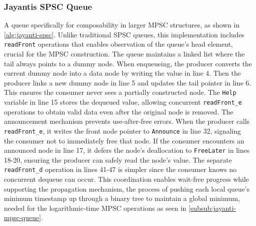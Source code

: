 \subsubsection{Jayantis \ac{SPSC} Queue}\label{subsub:jayanti-spsc-queue}
A queue specifically for composability in larger \ac{MPSC} structures, as shown in \cref{alg:jayanti-spsc}. Unlike traditional \ac{SPSC} queues, this implementation includes \texttt{readFront} operations that enables observation of the queue's head element, crucial for the \ac{MPSC} construction. The queue maintains a linked list where the tail always points to a dummy node. When enqueueing, the producer converts the current dummy node into a data node by writing the value in line 4. Then the producer links a new dummy node in line 5 and updates the tail pointer in line 6. This ensures the consumer never sees a partially constructed node. The \texttt{Help} variable in line 15 stores the dequeued value, allowing concurrent \texttt{readFront\_e} operations to obtain valid data even after the original node is removed. The announcement mechanism prevents use-after-free errors. When the producer calls \texttt{readFront\_e}, it writes the front node pointer to \texttt{Announce} in line 32, signaling the consumer not to immediately free that node. If the consumer encounters an announced node in line 17, it defers the node's deallocation to \texttt{FreeLater} in lines 18-20, ensuring the producer can safely read the node's value. The separate \texttt{readFront\_d} operation in lines 41-47 is simpler since the consumer knows no concurrent dequeue can occur. This coordination enables wait-free progress while supporting the propagation mechanism, the process of pushing each local queue's minimum timestamp up through a binary tree to maintain a global minimum, needed for the logarithmic-time \ac{MPSC} operations as seen in \cref{subsub:jayanti-mpsc-queue}. \cite{JayantiLog}

